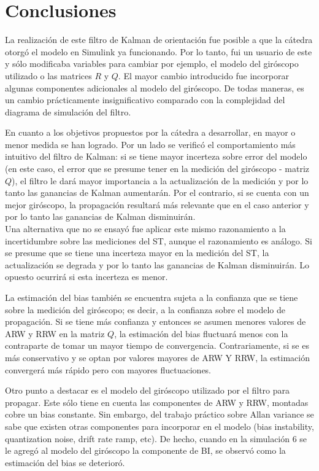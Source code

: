 \documentclass[a4paper,11pt,twoside]{IT-CNEA}
\begin{document}
\section{Conclusiones}
La realización de este filtro de Kalman de orientación fue posible a que la cátedra otorgó el modelo en Simulink ya funcionando. Por lo tanto, fui un usuario de este y sólo modificaba variables para cambiar por ejemplo, el modelo del giróscopo utilizado o las matrices $R$ y $Q$. El mayor cambio introducido fue incorporar algunas componentes adicionales al modelo del giróscopo. De todas maneras, es un cambio prácticamente insignificativo comparado con la complejidad del diagrama de simulación del filtro.
\par En cuanto a los objetivos propuestos por la cátedra a desarrollar, en mayor o menor medida se han logrado. Por un lado se verificó el comportamiento más intuitivo del filtro de Kalman: si se tiene mayor incerteza sobre error del modelo (en este caso, el error que se presume tener en la medición del giróscopo - matriz $Q$), el filtro le dará mayor importancia a la actualización de la medición y por lo tanto las ganancias de Kalman aumentarán. Por el contrario, si se cuenta con un mejor giróscopo, la propagación resultará más relevante que en el caso anterior y por lo tanto las ganancias de Kalman disminuirán. 
\\ Una alternativa que no se ensayó fue aplicar este mismo razonamiento a la incertidumbre sobre las mediciones del ST, aunque el razonamiento es análogo. Si se presume que se tiene una incerteza mayor en la medición del ST, la actualización se degrada y por lo tanto las ganancias de Kalman disminuirán. Lo opuesto ocurrirá si esta incerteza es menor. 
\par La estimación del bias también se encuentra sujeta a la confianza que se tiene sobre la medición del giróscopo; es decir, a la confianza sobre el modelo de propagación. Si se tiene más confianza y entonces se asumen menores valores de ARW y RRW en la matriz $Q$, la estimación del bias fluctuará menos con la contraparte de tomar un mayor tiempo de convergencia. Contrariamente, si se es más conservativo y se optan por valores mayores de ARW Y RRW, la estimación convergerá más rápido pero con mayores fluctuaciones. 
\par Otro punto a destacar es el modelo del giróscopo utilizado por el filtro para propagar. Este sólo tiene en cuenta las componentes de ARW y RRW, montadas cobre un bias constante. Sin embargo, del trabajo práctico sobre Allan variance se sabe que existen otras componentes para incorporar en el modelo (bias instability, quantization noise, drift rate ramp, etc). De hecho, cuando en la simulación 6 se le agregó al modelo del giróscopo la componente de BI, se observó como la estimación del bias se deterioró. 
\end{document}
